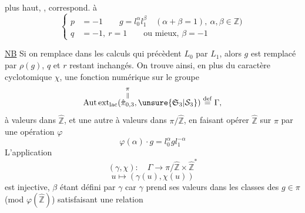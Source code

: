 plus haut,  , correspond.  à
\[
\left\{\begin{aligned}
p&=-1\qquad g=l_0^\alpha l_1^\beta\quad(\alpha+\beta=1),\ \alpha,\beta\in\mathbb Z)\\
q&=-1,\ r=1\qquad\text{ou mieux, }\beta=-1
\end{aligned}\right.
\]

\uline{NB} Si on remplace dans les calculs qui précèdent $L_0$ par $L_1$, alors $g$ est remplacé par $\rho(g)$, $q$ et $r$ restant inchangés. On trouve ainsi, en plus du caractère cyclotomique $\chi$, une  fonction numérique \inserted{$\beta$} sur le groupe
\[
\operatorname{Aut\,ext}_{\mathrm{lac}}(\overset{\pi}{\overset{\Vert}{\hat\pi_{0,3}}},\unsure{\mathfrak S_3|\mathcal S_3})\overset{\mathrm{def}}=\Gamma,
\]
 à valeurs dans $\hat{\mathbb Z}$, et une autre \inserted{$\gamma$} à valeurs dans $\pi/\hat{\mathbb Z}$, en faisant opérer $\hat{\mathbb Z}$ sur $\pi$ par une opération $\varphi$
\[
\varphi(\alpha)\cdot g=l_0^\alpha gl_1^{-\alpha}
\]
L'application
\[
(\gamma,\chi):\quad\Gamma\longrightarrow\pi/\hat{\mathbb Z}\times\hat{\mathbb Z}^{*}
\]
\[
u\longmapsto(\gamma(u),\chi(u))
\]
est injective,  $\beta$ étant défini par $\gamma$ car $\gamma$ prend ses valeurs dans les classes des $g\in\pi$ (mod $\varphi(\hat{\mathbb Z})$) satisfaisant une relation
